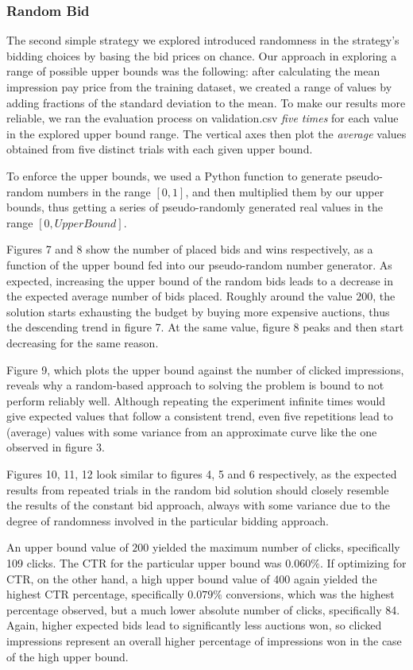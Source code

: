 \documentclass{sig-alternate-05-2015}
\begin{document}
\subsubsection{Random Bid}

The second simple strategy we explored introduced randomness in the strategy's bidding choices by basing the bid prices on chance. Our approach in exploring a range of possible upper bounds was the following: after calculating the mean impression pay price from the training dataset, we created a range of values by adding fractions of the standard deviation to the mean. To make our results more reliable, we ran the evaluation process on validation.csv \textit{five times} for each value in the explored upper bound range. The vertical axes then plot the \textit{average} values obtained from five distinct trials with each given upper bound.

To enforce the upper bounds, we used a Python function to generate pseudo-random numbers in the range $[0,1]$, and then multiplied them by our upper bounds, thus getting a series of pseudo-randomly generated real values in the range $[0, UpperBound]$.

Figures 7 and 8 show the number of placed bids and wins respectively, as a function of the upper bound fed into our pseudo-random number generator. As expected, increasing the upper bound of the random bids leads to a decrease in the expected average number of bids placed. Roughly around the value $200$, the solution starts exhausting the budget by buying more expensive auctions, thus the descending trend in figure 7. At the same value, figure 8 peaks and then start decreasing for the same reason.

Figure 9, which plots the upper bound against the number of clicked impressions, reveals why a random-based approach to solving the problem is bound to not perform reliably well. Although repeating the experiment infinite times would give expected values that follow a consistent trend, even five repetitions lead to (average) values with some variance from an approximate curve like the one observed in figure 3.

Figures 10, 11, 12 look similar to figures 4, 5 and 6 respectively, as the expected results from repeated trials in the random bid solution should closely resemble the results of the constant bid approach, always with some variance due to the degree of randomness involved in the particular bidding approach.

An upper bound value of $200$ yielded the maximum number of clicks, specifically 109 clicks. The CTR for the particular upper bound was $0.060\%$. If optimizing for CTR, on the other hand, a high upper bound value of 400 again yielded the highest CTR percentage, specifically $0.079\%$ conversions, which was the highest percentage observed, but a much lower absolute number of clicks, specifically 84. Again, higher expected bids lead to significantly less auctions won, so clicked impressions represent an overall higher percentage of impressions won in the case of the high upper bound.
\end{document}
